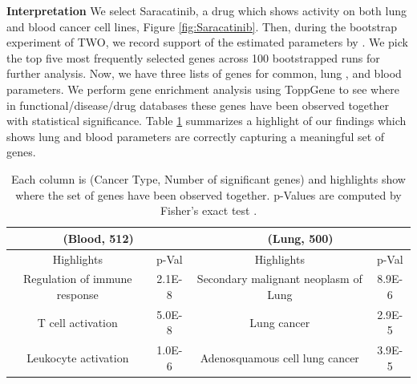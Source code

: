 {\bf Interpretation}
We select Saracatinib, a drug which shows activity on both lung and blood cancer cell lines, Figure \ref{fig:Saracatinib}. 
Then, during the bootstrap experiment of TWO, we record support of the estimated parameters by \dc. 
We pick the top five most frequently selected genes across 100 bootstrapped runs for further analysis. 
Now, we have three lists of genes for common, lung , and blood parameters. 
We perform gene enrichment analysis using ToppGene \cite{chen09toppgene} to see where in functional/disease/drug databases these genes have been observed together with statistical significance. 
Table \ref{table:1} summarizes a highlight of our findings which shows lung and blood parameters are correctly capturing a meaningful set of genes.%
\begin{table}
	\centering
	\begin{tabular}{ |c|c|c|c|  }
		\hline 	
		\multicolumn{2}{|c|}{(Blood, 512)} & \multicolumn{2}{c|}{(Lung, 500)}\\
		\hline
		Highlights &    p-Val  & Highlights &    p-Val   \\
		\hline
		Regulation of immune response	 & 2.1E-8  & Secondary malignant neoplasm of Lung & 8.9E-6  \\
		T cell activation	 & 5.0E-8   & Lung cancer  & 2.9E-5   \\
		Leukocyte activation & 1.0E-6  & Adenosquamous cell lung cancer	 & 3.9E-5 \\
		\hline
	\end{tabular}
\caption{Each column is (Cancer Type, Number of significant genes) and highlights show where the set of genes have been observed together. p-Values are computed by  Fisher's exact test \cite{chen09toppgene}.}
\label{table:1}
\end{table}

